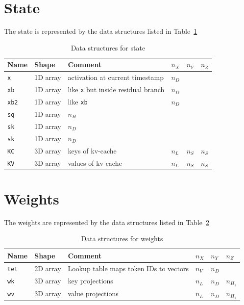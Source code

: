 \documentclass[letterpaper,12pt]{article}
\begin{document}
\section{State}
\label{state}
The state is represented by the data structures listed in
Table~\ref{tbl_state_data}
\begin{table}[h]
  \begin{tabular}{|l|l|l|l|l|l|} \hline \hline
    {\bf Name} & {\bf Shape} & {\bf Comment} & \(n_X\) & \(n_Y\) & \(n_Z\) \\ \hline
    {\tt x} & 1D array & activation at current timestamp &  \(n_D\) & & \\ \hline
    {\tt xb} & 1D array & like {\tt x} but inside residual branch & \(n_D\) & &
    \\ \hline
    {\tt xb2} & 1D array & like {\tt xb} & \(n_D\) & & \\ \hline
    \hline
    {\tt sq} & 1D array & \(n_H\) & & \\ \hline
    {\tt sk} & 1D array & \(n_D\) & & \\ \hline
    {\tt sk} & 1D array & \(n_D\) & & \\ \hline
\hline
    {\tt KC} & 3D array & keys of kv-cache & \(n_L\) & \(n_S\) & \(n_S\)  \\
    \hline 
    {\tt KV} & 3D array & values of kv-cache & \(n_L\) & \(n_S\) & \(n_S\)  \\ \hline 
    \hline
\end{tabular}
  \caption{Data structures for state}
  \label{tbl_state_data}
\end{table}

\section{Weights}
\label{weights}
The weights are represented by the data structures listed in
Table~\ref{tbl_weights_data}

\begin{table}
  \begin{tabular}{|l|l|l|l|l|l|} \hline \hline
    {\bf Name} & {\bf Shape} & {\bf Comment} & \(n_X\) & \(n_Y\) & \(n_Z\) \\ \hline
    {\tt tet} & 2D array & Lookup table maps token IDs to vectors  & \(n_V\) & \(n_D\) & \\ \hline 
    {\tt wk} & 3D array & key projections & \(n_L\) & \(n_D\) & \(n_{H_1}\) \\ \hline 
    {\tt wv} & 3D array & value projections & \(n_L\) & \(n_D\) & \(n_{H_1}\) \\ \hline 

    \hline
\end{tabular}
  \caption{Data structures for weights}
  \label{tbl_weights_data}
\end{table}
\end{document}
